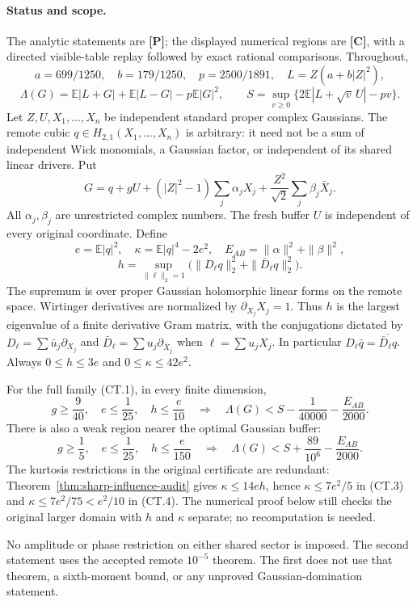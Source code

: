 \paragraph{Status and scope.}
The analytic statements are \textbf{[P]}; the displayed numerical regions
are \textbf{[C]}, with a directed visible-table replay followed by exact
rational comparisons. Throughout,
\[
 a=699/1250,\quad b=179/1250,\quad p=2500/1891,\quad
 L=Z(a+b|Z|^2),
\]
\[
 \Lambda(G)=\mathbb E|L+G|+\mathbb E|L-G|-p\mathbb E|G|^2,\qquad
 S=\sup_{v\ge0}\{2\mathbb E|L+\sqrt v\,U|-pv\}.
\]
Let \(Z,U,X_1,\ldots,X_n\) be independent standard proper complex
Gaussians. The remote cubic \(q\in H_{2,1}(X_1,\ldots,X_n)\) is
arbitrary: it need not be a sum of independent Wick monomials, a
Gaussian factor, or independent of its shared linear drivers. Put
\[
 G=q+gU+(|Z|^2-1)\sum_j\alpha_jX_j+
                 \frac{Z^2}{\sqrt2}\sum_j\beta_j\bar X_j.
 \tag{CT.1}
\]
All \(\alpha_j,\beta_j\) are unrestricted complex numbers. The fresh
buffer \(U\) is independent of every original coordinate. Define
\[
 e=\mathbb E|q|^2,\quad
 \kappa=\mathbb E|q|^4-2e^2,\quad E_{AB}=\|\alpha\|^2+\|\beta\|^2,
\]
\[
 h=\sup_{\|\ell\|_2=1}
 \bigl(\|D_\ell q\|_2^2+\|\bar D_\ell q\|_2^2\bigr).
 \tag{CT.2}
\]
The supremum is over proper Gaussian holomorphic linear forms on the
remote space. Wirtinger derivatives are normalized by
\(\partial_{X_j}X_j=1\). Thus \(h\) is the largest eigenvalue of a
finite derivative Gram matrix, with the conjugations dictated by
\(D_\ell=\sum\bar u_j\partial_{X_j}\) and
\(\bar D_\ell=\sum u_j\partial_{\bar X_j}\) when
\(\ell=\sum u_jX_j\). In particular
\(D_\ell\bar q=\overline{\bar D_\ell q}\).
Always \(0\le h\le3e\) and \(0\le\kappa\le42e^2\).

\begin{theorem}
\label{thm:ct-influence}
For the full family (CT.1), in every finite dimension,
\[
 \boxed{
 g\ge\frac9{40},\quad e\le\frac1{25},\quad
 h\le\frac e{10}
 \quad\Longrightarrow\quad
 \Lambda(G)<S-\frac1{40000}-\frac{E_{AB}}{2000}.}
 \tag{CT.3}
\]
There is also a weak region nearer the optimal Gaussian buffer:
\[
 \boxed{
 g\ge\frac15,\quad e\le\frac1{25},\quad
 h\le\frac e{150}
 \quad\Longrightarrow\quad
 \Lambda(G)<S+\frac{89}{10^6}-\frac{E_{AB}}{2000}.}
 \tag{CT.4}
\]
The kurtosis restrictions in the original certificate are redundant:
Theorem~\ref{thm:sharp-influence-audit} gives $\kappa\le14eh$,
hence $\kappa\le7e^2/5$ in (CT.3) and $\kappa\le7e^2/75<e^2/10$
in (CT.4). The numerical proof below still checks the original
larger domain with $h$ and $\kappa$ separate; no recomputation is needed.

No amplitude or phase restriction on either shared sector is imposed.
The second statement uses the accepted remote \(10^{-5}\) theorem.
The first does not use that theorem, a sixth-moment bound, or any
unproved Gaussian-domination statement.
\end{theorem}

